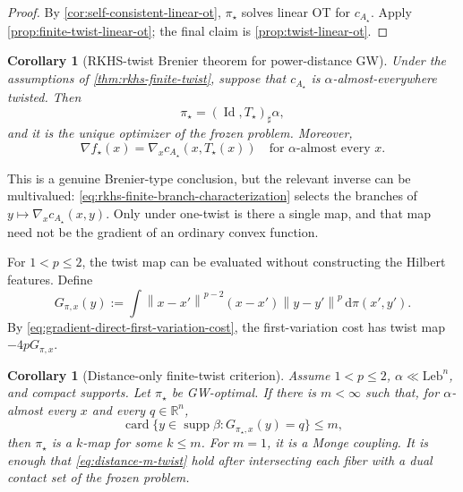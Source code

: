 \documentclass[11pt,a4paper]{article}
\newtheorem{corollary}[theorem]{Corollary}
\theoremstyle{definition}
\theoremstyle{remark}
\newcommand{\R}{\mathbb R}
\newcommand{\Id}{\operatorname{Id}}
\newcommand{\supp}{\operatorname{supp}}
\newcommand{\card}{\operatorname{card}}
\newcommand{\dd}{\,\mathrm d}
\newcommand{\norm}[1]{\left\lVert #1\right\rVert}
\begin{document}
\begin{proof}
By \cref{cor:self-consistent-linear-ot}, \(\pi_\star\) solves linear OT for
\(c_{A_\star}\).  Apply \cref{prop:finite-twist-linear-ot}; the final claim is
\cref{prop:twist-linear-ot}.
\end{proof}

\begin{corollary}[RKHS-twist Brenier theorem for power-distance GW]
\label{thm:rkhs-twist-brenier}
Under the assumptions of \cref{thm:rkhs-finite-twist}, suppose that
\(c_{A_\star}\) is \(\alpha\)-almost-everywhere twisted.  Then
\begin{equation}
  \pi_\star=(\Id,T_\star)_\sharp\alpha,
  \label{eq:gw-monge-map}
\end{equation}
and it is the unique optimizer of the frozen problem.  Moreover,
\begin{equation}
  \nabla f_\star(x)
  =\nabla_xc_{A_\star}(x,T_\star(x))
  \quad\text{for \(\alpha\)-almost every }x.
  \label{eq:rkhs-brenier-characterization}
\end{equation}
\end{corollary}

This is a genuine Brenier-type conclusion, but the relevant inverse can be
multivalued: \eqref{eq:rkhs-finite-branch-characterization} selects the
branches of \(y\mapsto\nabla_xc_{A_\star}(x,y)\).  Only under one-twist is
there a single map, and that map need not be the gradient of an ordinary
convex function.

For \(1<p\leq2\), the twist map can be evaluated without constructing the
Hilbert features.  Define
\begin{equation}
  G_{\pi,x}(y)
  :=\int
  \norm{x-x'}^{p-2}(x-x')\norm{y-y'}^p
  \dd\pi(x',y').
  \label{eq:power-distance-twist-map}
\end{equation}
By \eqref{eq:gradient-direct-first-variation-cost}, the first-variation cost
has twist map \(-4pG_{\pi,x}\).

\begin{corollary}[Distance-only finite-twist criterion]
\label{cor:distance-only-twist}
Assume \(1<p\leq2\), \(\alpha\ll\mathrm{Leb}^n\), and compact supports.  Let
\(\pi_\star\) be GW-optimal.  If there is \(m<\infty\) such that, for
\(\alpha\)-almost every \(x\) and every \(q\in\R^n\),
\begin{equation}
  \card\{y\in\supp\beta:G_{\pi_\star,x}(y)=q\}\leq m,
  \label{eq:distance-m-twist}
\end{equation}
then \(\pi_\star\) is a \(k\)-map for some \(k\leq m\).  For \(m=1\), it is
a Monge coupling.  It is enough that \eqref{eq:distance-m-twist} hold after
intersecting each fiber with a dual contact set of the frozen problem.
\end{corollary}
\end{document}
